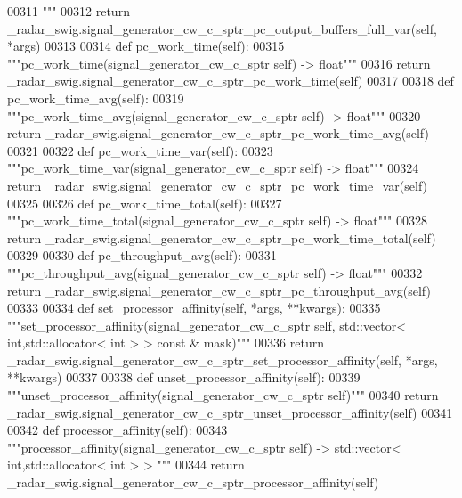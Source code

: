 \begin{DoxyCode}
{{{00311 \textcolor{stringliteral}{        """}
00312         \textcolor{keywordflow}{return} \_radar\_swig.signal\_generator\_cw\_c\_sptr\_pc\_output\_buffers\_full\_var(self, *args)
00313 
00314     \textcolor{keyword}{def }pc_work_time(self):
00315         \textcolor{stringliteral}{"""pc\_work\_time(signal\_generator\_cw\_c\_sptr self) -> float"""}
00316         \textcolor{keywordflow}{return} \_radar\_swig.signal\_generator\_cw\_c\_sptr\_pc\_work\_time(self)
00317 
00318     \textcolor{keyword}{def }pc_work_time_avg(self):
00319         \textcolor{stringliteral}{"""pc\_work\_time\_avg(signal\_generator\_cw\_c\_sptr self) -> float"""}
00320         \textcolor{keywordflow}{return} \_radar\_swig.signal\_generator\_cw\_c\_sptr\_pc\_work\_time\_avg(self)
00321 
00322     \textcolor{keyword}{def }pc_work_time_var(self):
00323         \textcolor{stringliteral}{"""pc\_work\_time\_var(signal\_generator\_cw\_c\_sptr self) -> float"""}
00324         \textcolor{keywordflow}{return} \_radar\_swig.signal\_generator\_cw\_c\_sptr\_pc\_work\_time\_var(self)
00325 
00326     \textcolor{keyword}{def }pc_work_time_total(self):
00327         \textcolor{stringliteral}{"""pc\_work\_time\_total(signal\_generator\_cw\_c\_sptr self) -> float"""}
00328         \textcolor{keywordflow}{return} \_radar\_swig.signal\_generator\_cw\_c\_sptr\_pc\_work\_time\_total(self)
00329 
00330     \textcolor{keyword}{def }pc_throughput_avg(self):
00331         \textcolor{stringliteral}{"""pc\_throughput\_avg(signal\_generator\_cw\_c\_sptr self) -> float"""}
00332         \textcolor{keywordflow}{return} \_radar\_swig.signal\_generator\_cw\_c\_sptr\_pc\_throughput\_avg(self)
00333 
00334     \textcolor{keyword}{def }set_processor_affinity(self, *args, **kwargs):
00335         \textcolor{stringliteral}{"""set\_processor\_affinity(signal\_generator\_cw\_c\_sptr self, std::vector< int,std::allocator< int > >
       const & mask)"""}
00336         \textcolor{keywordflow}{return} \_radar\_swig.signal\_generator\_cw\_c\_sptr\_set\_processor\_affinity(self, *args, **kwargs)
00337 
00338     \textcolor{keyword}{def }unset_processor_affinity(self):
00339         \textcolor{stringliteral}{"""unset\_processor\_affinity(signal\_generator\_cw\_c\_sptr self)"""}
00340         \textcolor{keywordflow}{return} \_radar\_swig.signal\_generator\_cw\_c\_sptr\_unset\_processor\_affinity(self)
00341 
00342     \textcolor{keyword}{def }processor_affinity(self):
00343         \textcolor{stringliteral}{"""processor\_affinity(signal\_generator\_cw\_c\_sptr self) -> std::vector< int,std::allocator< int > >
      """}
00344         \textcolor{keywordflow}{return} \_radar\_swig.signal\_generator\_cw\_c\_sptr\_processor\_affinity(self)
}}}
\end{DoxyCode}
